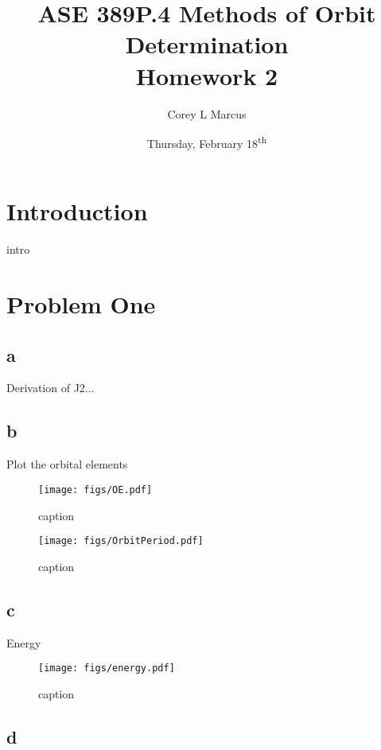 \documentclass[11pt]{article}
\title{ASE 389P.4 Methods of Orbit Determination \\ Homework 2}
\author{Corey L Marcus} \date{Thursday, February 18\textsuperscript{th}}
\begin{document}
\onehalfspace
\maketitle


\section{Introduction}

intro

\section{Problem One}

\subsection{a}

Derivation of J2...

\subsection{b}

Plot the orbital elements

\begin{figure}[h!]
	\centering
	\texttt{[image: figs/OE.pdf]}
	\caption{caption}
	\label{fig:OE}
\end{figure}

\begin{figure}[h!]
	\centering
	\texttt{[image: figs/OrbitPeriod.pdf]}
	\caption{caption}
	\label{fig:OrbitPeriod}
\end{figure}

\subsection{c}

Energy

\begin{figure}[h!]
	\centering
	\texttt{[image: figs/energy.pdf]}
	\caption{caption}
	\label{fig:energy}
\end{figure}

\subsection{d}
\end{document}
